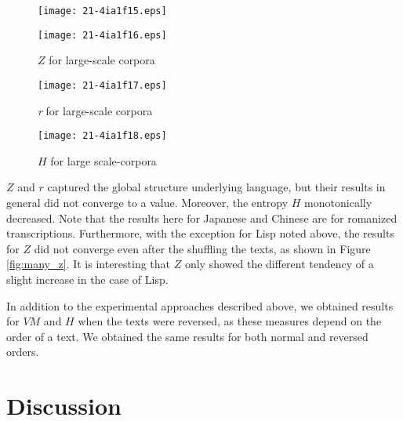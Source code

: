 \documentclass[english]{jnlp_1.4_rep}
\begin{document}
\begin{figure}[b]
\setlength{\captionwidth}{0.49\hsize}
\begin{minipage}[t]{0.49\hsize}
\begin{center}
\texttt{[image: 21-4ia1f15.eps]}
\end{center}
\caption{$Z$ for large-scale corpora}
\label{fig:many_z}
\end{minipage}
\hfill
\begin{minipage}[t]{0.49\hsize}
\begin{center}
\texttt{[image: 21-4ia1f16.eps]}
\end{center}
\label{fig:many_sh_z}
\end{minipage}
\end{figure}
\begin{figure}[b]
\begin{minipage}{0.45\hsize}
\begin{center}
\texttt{[image: 21-4ia1f17.eps]}
\end{center}
\caption{{\it r} for large-scale corpora}
\label{fig:many_r}
\end{minipage}
\hfill
\begin{minipage}{0.45\hsize}
\begin{center}
\texttt{[image: 21-4ia1f18.eps]}
\end{center}
\caption{$H$ for large scale-corpora}
\label{fig:many_h}
\end{minipage}
\end{figure}

$Z$ and $r$ captured the global structure underlying language, 
but their results in general did not converge to a value. Moreover, the 
entropy $H$ monotonically decreased. Note that the results here for Japanese and Chinese 
are for romanized transcriptions. Furthermore, with the exception for Lisp noted above, 
the results for $Z$ did not converge even after the shuffling the texts, 
as shown in Figure \ref{fig:many_z}. 
It is interesting that $Z$ only showed the different tendency of a slight increase in the case of Lisp.

In addition to the experimental approaches described above, 
we obtained results for $\mathit{VM}$ and $H$ when the texts were reversed, as these 
measures depend on the order of a text. We obtained the same results for both  normal and reversed orders. 


\section{Discussion}
\end{document}
